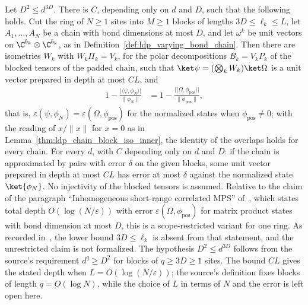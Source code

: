 \begin{lemma}
    \label{thm:ldp_inhomogeneous}
    \leanok
    Let $D^2\le d^{3D}$. There is $C$, depending only on $d$ and $D$, such that
    the following holds. Cut the ring of $N\ge1$ sites into $M\ge1$ blocks of lengths
    $3D\le\ell_k\le L$, let $A_1,\dots,A_N$ be a chain with bond dimensions at
    most $D$, and let $\omega^k$ be unit vectors on $\C^{b_k}\otimes\C^{b_k}$, as
    in Definition~\ref{def:ldp_varying_bond_chain}. Then there are isometries
    $W_k$ with $W_k\Pi_k=V_k$, for the polar decompositions $B_k=V_kP_k$ of
    the blocked tensors of the padded chain, such that
    $\ket\psi=(\bigotimes_kW_k)\ket\Omega$ is a unit vector prepared in depth at
    most $CL$, and
    \begin{align}
        1-\frac{\lvert\langle\psi,\phi_N\rangle\rvert}{\lVert\phi_N\rVert}
         & =1-\frac{\lvert\langle\Omega,\phi_{\mathrm{pos}}\rangle\rvert}
        {\lVert\phi_{\mathrm{pos}}\rVert},
        \label{eq:ldp_inhomogeneous_error}
    \end{align}
    that is, $\varepsilon(\psi,\phi_N)=\varepsilon(\Omega,\phi_{\mathrm{pos}})$
    for the normalized states when $\phi_{\mathrm{pos}}\ne0$; with the
    reading of $x/\lVert x\rVert$ for $x=0$ as in
    Lemma~\ref{thm:ldp_chain_block_iso_inner}, the identity of the overlaps
    holds for every chain. For every $d$, with $C$ depending only on $d$
    and $D$: if the chain is approximated by pairs with error $\delta$ on the
    given blocks, some unit vector prepared in depth at most $CL$ has error at
    most $\delta$ against the normalized state $\ket{\phi_N}$. No injectivity
    of the blocked tensors is assumed. Relative to the claim of the paragraph
    ``Inhomogeneous short-range correlated MPS'' of~\cite{Malz2024Preparation},
    which states total depth $O(\log(N/\varepsilon))$ with error
    $\varepsilon(\Omega,\phi_{\mathrm{pos}})$ for matrix product states with
    bond dimension at most $D$, this is a scope-restricted variant for one ring.
    As recorded in~\cite{gap:mswc24_inhomogeneous_scope}, the lower bound
    $3D\le\ell_k$ is absent from that statement, and the unrestricted claim is
    not formalized. The hypothesis $D^2\le d^{3D}$ follows from the
    source's requirement $d^q\ge D^2$ for blocks of $q\ge3D\ge1$ sites. The
    bound $CL$ gives the stated depth when $L=O(\log(N/\varepsilon))$; the
    source's definition fixes blocks of length $q=O(\log N)$, while the choice
    of $L$ in terms of $N$ and the error is left open here.
\end{lemma}
